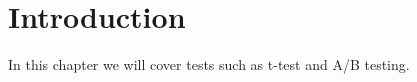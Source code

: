 \section{Introduction}
\label{sec:TestsIntroduction}

In this chapter we will cover tests such as t-test and A/B testing.


